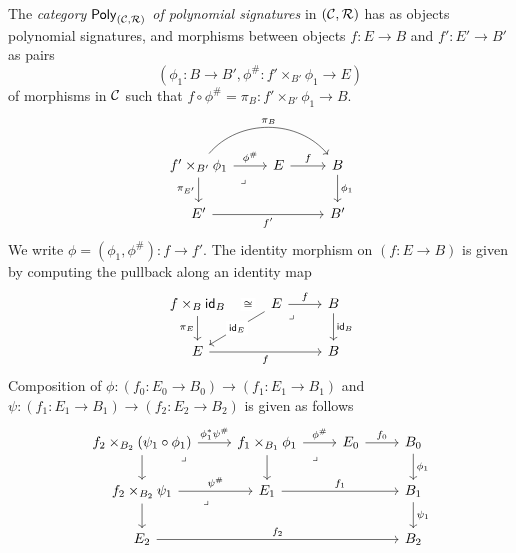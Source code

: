 \begin{definition}
  The \emph{category $\mathsf{Poly}_{(\mathcal{C},\mathcal{R})}$ of polynomial signatures}
  in $(\mathcal{C},\mathcal{R})$ has as objects
  polynomial signatures, and morphisms between objects
  $f : E \to B$ and $f' : E' \to B'$ as pairs
  \[(\phi_1 : B \to B', \phi^\# : f' \times_{B'} \phi_1 \to E)\]
  of morphisms in $\mathcal{C}$ such that
  $f \circ \phi^\# = \pi_B : f' \times_{B'} \phi_1 \to B$.
  \[
  \begin{tikzcd}
    {f' \times_{B'} \phi_1} & E & B \\
    {E'} && {B'}
    \arrow["{\phi^\#}", from=1-1, to=1-2]
    \arrow["{\pi_B}", bend left = 50, from=1-1, to=1-3]
    \arrow["{\pi_{E'}}"', from=1-1, to=2-1]
    \arrow["\lrcorner"{anchor=center, pos=0.125}, draw=none, from=1-1, to=2-3]
    \arrow["f", from=1-2, to=1-3]
    \arrow["{\phi_1}", from=1-3, to=2-3]
    \arrow["{f'}"', from=2-1, to=2-3]
  \end{tikzcd}\]
  We write $\phi = (\phi_1, \phi^\#) : f \to f'$.
  The identity morphism on $(f : E \to B)$ is given by
  computing the pullback along an identity map
  \[
    \begin{tikzcd}
      {f \times_{B} \id_B} & E & B \\
      E && B
      \arrow["{{\iso}}"{description}, draw=none, from=1-1, to=1-2]
      \arrow["{{\pi_{E}}}"', from=1-1, to=2-1]
      \arrow["f", from=1-2, to=1-3]
      \arrow["{\id_E}"{description}, from=1-2, to=2-1]
      \arrow["\lrcorner"{anchor=center, pos=0.125}, draw=none, from=1-2, to=2-3]
      \arrow["{{\id_B}}", from=1-3, to=2-3]
      \arrow["{{f}}"', from=2-1, to=2-3]
    \end{tikzcd}
  \]
  Composition of $\phi : (f_0 : E_0 \to B_0) \to (f_1 : E_1 \to B_1)$
  and $\psi : (f_1 : E_1 \to B_1) \to (f_2 : E_2 \to B_2)$
  is given as follows
  \[
  \begin{tikzcd}
    {f_2 \times_{B_2} (\psi_1 \circ \phi_1)} & {f_1 \times_{B_1} \phi_1} & {E_0} & {B_0} \\
    {f_2 \times_{B_2} \psi_1} & {E_1} && {B_1} \\
    {E_2} &&& {B_2}
    \arrow["{\phi_1^* \psi^\#}", from=1-1, to=1-2]
    \arrow[from=1-1, to=2-1]
    \arrow["\lrcorner"{anchor=center, pos=0.125}, draw=none, from=1-1, to=2-2]
    \arrow["{\phi^\#}", from=1-2, to=1-3]
    \arrow[from=1-2, to=2-2]
    \arrow["\lrcorner"{anchor=center, pos=0.125}, draw=none, from=1-2, to=2-4]
    \arrow["{f_0}", from=1-3, to=1-4]
    \arrow["{\phi_1}", from=1-4, to=2-4]
    \arrow["{\psi^\#}", from=2-1, to=2-2]
    \arrow[from=2-1, to=3-1]
    \arrow["\lrcorner"{anchor=center, pos=0.125}, draw=none, from=2-1, to=3-4]
    \arrow["{f_1}", from=2-2, to=2-4]
    \arrow["{\psi_1}", from=2-4, to=3-4]
    \arrow["{f_2}", from=3-1, to=3-4]
  \end{tikzcd}
  \]
\end{definition}

